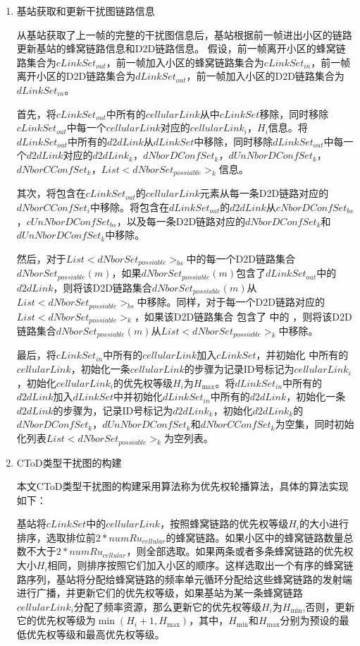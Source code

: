 \documentclass[figurelist,tablelist,algorithmlist,nomlist,masters]{seuthesix}
\begin{document}
	
	\begin{enumerate}
		\item 基站获取和更新干扰图链路信息
		
		从基站获取了上一帧的完整的干扰图信息后，基站根据前一帧进出小区的链路更新基站的蜂窝链路信息和D2D链路信息。
		假设，前一帧离开小区的蜂窝链路集合为$cLinkSe{t_{out}}$，前一帧加入小区的蜂窝链路集合为$cLinkSe{t_{in}}$，前一帧离开小区的D2D链路集合为$dLinkSe{t_{out}}$，前一帧加入小区的D2D链路集合为$dLinkSe{t_{in}}$。
		
		首先，将$cLinkSe{t_{out}}$中所有的$cellularLink$从中$cLinkSet$移除，同时移除$cLinkSe{t_{out}}$中每一个$cellularLink$对应的$cellularLin{k_i}$，${H_i}$信息。将$dLinkSe{t_{out}}$中所有的$d2dLink$从$dLinkSet$中移除，同时移除$dLinkSe{t_{out}}$中每一个$d2dLink$对应的$d2dLin{k_k}$，$dNborDConfSe{t_k}$，$dUnNborDConfSe{t_k}$，$dNborCConfSe{t_k}$，$List < dNborSe{t_{possiable}}{ > _k}$信息。
		
		其次，将包含在$cLinkSe{t_{out}}$的$cellularLink$元素从每一条D2D链路对应的$dNborCConfSe{t_i}$中移除。将包含在$dLinkSe{t_{out}}$的$d2dLink$从$cNborDConfSe{t_{bs}}$，$cUnNborDConfSe{t_{bs}}$，以及每一条D2D链路对应的$dNborDConfSe{t_k}$和$dUnNborDConfSe{t_k}$中移除。
		
		然后，对于$List < dNborSe{t_{possiable}}{ > _{bs}}$中的每一个D2D链路集合$dNborSe{t_{possiable}}(m)$，如果$dNborSe{t_{possiable}}(m)$包含了$dLinkSe{t_{out}}$中的$d2dLink$，则将该D2D链路集合$dNborSe{t_{possiable}}(m)$从$List < dNborSe{t_{possiable}}{ > _{bs}}$中移除。同样，对于每一个D2D链路对应的$List < dNborSe{t_{possiable}}{ > _k}$，如果该D2D链路集合 包含了 中的 ，则将该D2D链路集合$dNborSe{t_{possiable}}(m)$从$List < dNborSe{t_{possiable}}{ > _k}$中移除。
		
		最后，将$cLinkSe{t_{in}}$中所有的$cellularLink$加入$cLinkSet$，并初始化 中所有的$cellularLink$，初始化一条$cellularLink$的步骤为记录ID号标记为$cellularLin{k_i}$，初始化$cellularLin{k_i}$的优先权等级${H_i}$为${H_{\max }}$。将$dLinkSe{t_{in}}$中所有的$d2dLink$加入$dLinkSet$中并初始化$dLinkSe{t_{in}}$中所有的$d2dLink$，初始化一条$d2dLink$的步骤为，记录ID号标记为$d2dLin{k_k}$，初始化$d2dLin{k_k}$的$dNborDConfSe{t_k}$，$dUnNborDConfSe{t_k}$和$dNborCConfSe{t_k}$为空集，同时初始化列表$List < dNborSe{t_{possiable}}{ > _k}$为空列表。
		
		\item CToD类型干扰图的构建
		
		本文CToD类型干扰图的构建采用算法称为优先权轮播算法，具体的算法实现如下：
		
		基站将$cLinkSet$中的$cellularLink$，按照蜂窝链路的优先权等级${H_i}$的大小进行排序，选取排位前$2*numR{u_{cellular}}$的蜂窝链路。如果小区中的蜂窝链路数量总数不大于$2*numR{u_{cellular}}$，则全部选取。如果两条或者多条蜂窝链路的优先权大小${H_i}$相同，则排序按照它们加入小区的顺序。这样选取出一个有序的蜂窝链路序列，基站将分配给蜂窝链路的频率单元循环分配给这些蜂窝链路的发射端进行广播，并更新它们的优先权等级，如果基站为某一条蜂窝链路$cellularLin{k_i}$分配了频率资源，那么更新它的优先权等级${H_i}$为${H_{\min }}$,否则，更新它的优先权等级为$\min ({H_i} + 1,{H_{\max }})$，其中，${H_{\min }}$和${H_{\max }}$分别为预设的最低优先权等级和最高优先权等级。
		

\end{enumerate}
\end{document}
